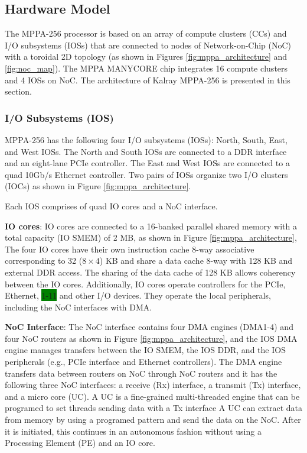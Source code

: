 \documentclass[conference,compsoc]{IEEEtran}
\begin{document}
\subsection{Hardware Model}
\label{sec:hardware_model}
The MPPA-256 processor is based on an array of compute clusters (CCs) and I/O subsystems (IOSs) that are connected to nodes of Network-on-Chip (NoC) with a toroidal 2D topology 
(as shown in Figures \ref{fig:mppa_architecture} and \ref{fig:noc_map}).
The MPPA MANYCORE chip integrates 16 compute clusters and 4 IOSs on NoC.
The architecture of Kalray MPPA-256 is presented in this section.

\subsubsection{I/O Subsystems (IOS)}
\label{sec:ios}
MPPA-256 has the following four I/O subsystems (IOSs): North, South, East, and West IOSs.
The North and South IOSs are connected to a DDR interface and an eight-lane PCIe controller.
The East and West IOSs are connected to a quad 10Gb/s Ethernet controller.
Two pairs of IOSs organize two I/O clusters (IOCs) as shown in Figure \ref{fig:mppa_architecture}.

Each IOS comprises of quad IO cores and a NoC interface.

\textbf{IO cores}: IO cores are connected to a 16-banked parallel shared memory with a total capacity (IO SMEM) of 2 MB, as shown in Figure \ref{fig:mppa_architecture},
The four IO cores have their own instruction cache 8-way associative corresponding to 32 ($8 \times 4$) KB and share a data cache 8-way with 128 KB and external DDR access.
The sharing of the data cache of 128 KB allows coherency between the IO cores.
Additionally, IO cores operate controllers for the PCIe, Ethernet, \colorbox{green}{1-11} and other I/O devices.
They operate the local peripherals, including the NoC interfaces with DMA.

\textbf{NoC Interface}: The NoC interface contains four DMA engines (DMA1-4) and four NoC routers as shown in Figure \ref{fig:mppa_architecture}, and the IOS DMA engine manages transfers between the IO SMEM, the IOS DDR, and the IOS peripherals (e.g., PCIe interface and Ethernet controllers).
The DMA engine transfers data between routers on NoC through NoC routers and it has the following three NoC interfaces: a receive (Rx) interface, a transmit (Tx) interface, and a micro core (UC).
A UC is a fine-grained multi-threaded engine that can be programed to set threads sending data with a Tx interface
A UC can extract data from memory by using a programed pattern and send the data on the NoC.
After it is initiated, this continues in an autonomous fashion without using a Processing Element (PE) and an IO core.
\end{document}
